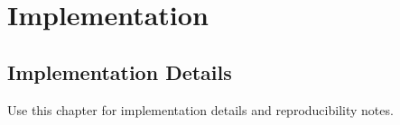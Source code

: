 \chapter{Implementation}
\label{chap:implementation}

\section{Implementation Details}
\label{sec:impldetails}

Use this chapter for implementation details and reproducibility notes.
